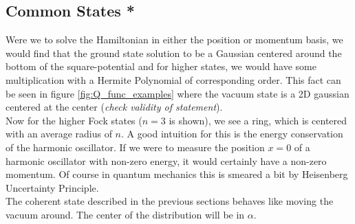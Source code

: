 \subsection{Common States *}
Were we to solve the Hamiltonian in either the position or momentum basis, we would find that the ground state solution to be a Gaussian centered around the bottom of the square-potential and for higher states, we would have some multiplication with a Hermite Polynomial of corresponding order. This fact can be seen in figure \ref{fig:Q_func_examples} where the vacuum state is a 2D gaussian centered at the center (\textit{check validity of statement}). \\
Now for the higher Fock states ($n = 3$ is shown), we see a ring, which is centered with an average radius of $n$. A good intuition for this is the energy conservation of the harmonic oscillator. If we were to measure the position $x=0$ of a harmonic oscillator with non-zero energy, it would certainly have a non-zero momentum. Of course in quantum mechanics this is smeared a bit by Heisenberg Uncertainty Principle.\\
The coherent state described in the previous sections behaves like moving the vacuum around. The center of the distribution will be in $\alpha$.  

